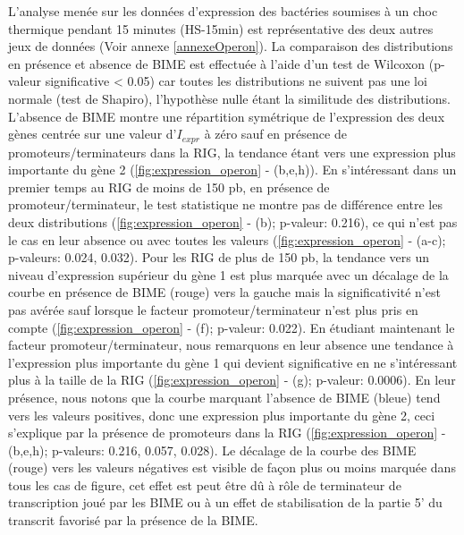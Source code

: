 \documentclass[12pt,a4paper]{report}
\begin{document}
\begin{onehalfspace}
L'analyse menée sur les données d'expression des bactéries soumises à un choc thermique pendant 15 minutes (HS-15min) est représentative des deux autres jeux de données (Voir annexe \ref{annexeOperon}). La comparaison des distributions en présence et absence de BIME est effectuée à l'aide d'un test de Wilcoxon (p-valeur significative < 0.05) car toutes les distributions ne suivent pas une loi normale (test de Shapiro), l'hypothèse nulle étant la similitude des distributions. L'absence de BIME montre une répartition symétrique de l'expression des deux gènes centrée sur une valeur d'$I_{expr}$ à zéro sauf en présence de promoteurs/terminateurs dans la RIG, la tendance étant vers une expression plus importante du gène 2 (\autoref{fig:expression_operon} - (b,e,h)).
En s'intéressant dans un premier temps au RIG de moins de 150 pb, en présence de promoteur/terminateur, le test statistique ne montre pas de différence entre les deux distributions (\autoref{fig:expression_operon} - (b); p-valeur: 0.216), ce qui n'est pas le cas en leur absence ou avec toutes les valeurs (\autoref{fig:expression_operon} - (a-c); p-valeurs: 0.024, 0.032). 
Pour les RIG de plus de 150 pb, la tendance vers un niveau d'expression supérieur du gène 1 est plus marquée avec un décalage de la courbe en présence de BIME (rouge) vers la gauche mais la significativité n'est pas avérée sauf lorsque le facteur promoteur/terminateur n'est plus pris en compte  (\autoref{fig:expression_operon} - (f); p-valeur: 0.022). 
En étudiant maintenant le facteur promoteur/terminateur, nous remarquons en leur absence une tendance à l'expression plus importante du gène 1 qui devient significative en ne s'intéressant plus à la taille de la RIG (\autoref{fig:expression_operon} - (g); p-valeur: 0.0006). En leur présence, nous notons que la courbe marquant l'absence de BIME (bleue) tend vers les valeurs positives, donc une expression plus importante du gène 2, ceci s'explique par la présence de promoteurs dans la RIG (\autoref{fig:expression_operon} - (b,e,h); p-valeurs: 0.216, 0.057, 0.028). Le décalage de la courbe des BIME (rouge) vers les valeurs négatives est visible de façon plus ou moins marquée dans tous les cas de figure, cet effet est peut être dû à rôle de terminateur de transcription joué par les BIME ou à un effet de stabilisation de la partie 5' du transcrit favorisé par la présence de la BIME.


\end{onehalfspace}
\end{document}
